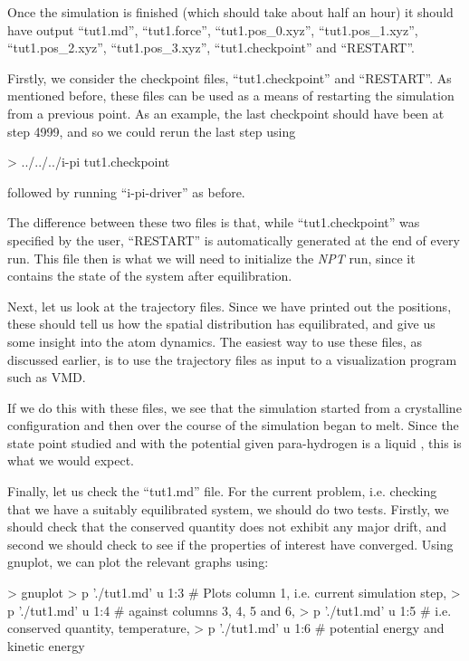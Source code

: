 \documentclass[11pt,english,fleqn]{report}
\newenvironment{code}{%
\footnotesize
\verbatim
}{
\endverbatim
\normalsize
}
\begin{document}
Once the simulation is finished (which should take about half an hour)
it should have output {}``tut1.md'', {}``tut1.force'', {}``tut1.pos\_0.xyz'',
{}``tut1.pos\_1.xyz'', {}``tut1.pos\_2.xyz'', {}``tut1.pos\_3.xyz'',
{}``tut1.checkpoint'' and {}``RESTART''.

Firstly, we consider the checkpoint files,
{}``tut1.checkpoint'' and {}``RESTART''.
As mentioned before, these files can be used as a means of restarting
the simulation from a previous point. As an example, the last
checkpoint should have been at step 4999, and so we could rerun
the last step using
\begin{code}
> ../../../i-pi tut1.checkpoint
\end{code}
followed by running {}``i-pi-driver'' as before.

The difference between these two files is that, while {}``tut1.checkpoint''
was specified by the user, {}``RESTART'' is automatically generated at the
end of every \ipi run. This file then is what we will need to initialize the
\emph{NPT} run, since it contains the state of the system after
equilibration.

Next, let us look at the trajectory files. Since we have printed out
the positions, these should tell us how the spatial distribution
has equilibrated, and give us some insight into the atom dynamics.
The easiest way to use these files, as discussed earlier, is to
use the trajectory files as input to a visualization program such as VMD.

If we do this with these files, we see that the simulation started
from a crystalline configuration and then over the course
of the simulation began to melt. Since the state point studied
and with the potential given para-hydrogen is a liquid \cite{silv-gold78jcp},
this is what we would expect.

Finally, let us check the {}``tut1.md'' file. For the current
problem, i.e. checking that we have a suitably equilibrated system,
we should do two tests. Firstly,
we should check that the conserved quantity does not exhibit any major
drift, and second we should check to see if the properties of interest
have converged. Using gnuplot, we can plot the relevant graphs using:

\begin{code}
> gnuplot
> p './tut1.md' u 1:3 # Plots column 1, i.e. current simulation step,
> p './tut1.md' u 1:4 # against columns 3, 4, 5 and 6,
> p './tut1.md' u 1:5 # i.e. conserved quantity, temperature,
> p './tut1.md' u 1:6 # potential energy and kinetic energy
\end{code}
\end{document}
